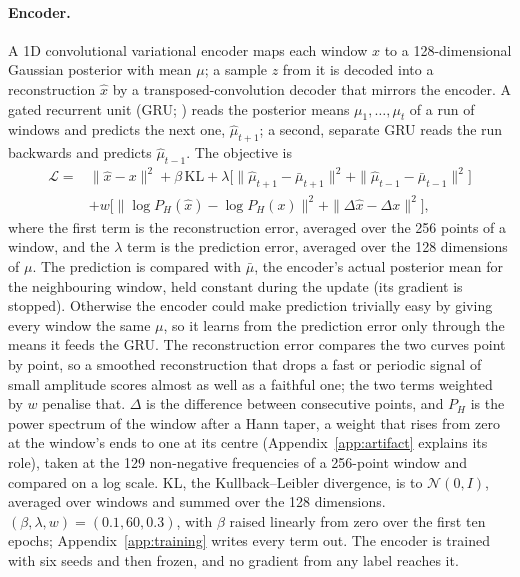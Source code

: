 \documentclass{article}
\begin{document}
\paragraph{Encoder.} A 1D convolutional variational encoder \citep{kingma2014} maps each window $x$
to a 128-dimensional Gaussian posterior with mean $\mu$; a sample $z$ from it is decoded into a
reconstruction $\hat{x}$ by a transposed-convolution decoder that mirrors the encoder. A gated
recurrent unit (GRU; \citealt{cho2014}) reads the posterior means $\mu_{1},\dots,\mu_{t}$ of a run of
windows and predicts the next one, $\hat{\mu}_{t+1}$; a second, separate GRU reads the run backwards
and predicts $\hat{\mu}_{t-1}$. The objective is
\begin{align*}
\mathcal{L} = {} & \|\hat{x}-x\|^{2} + \beta\,\mathrm{KL}
+ \lambda\big[\|\hat{\mu}_{t+1}-\bar{\mu}_{t+1}\|^{2} + \|\hat{\mu}_{t-1}-\bar{\mu}_{t-1}\|^{2}\big] \\
& + w\big[\|\log P_{H}(\hat{x})-\log P_{H}(x)\|^{2} + \|\Delta\hat{x}-\Delta x\|^{2}\big],
\end{align*}
where the first term is the reconstruction error, averaged over the 256 points of a window, and the
$\lambda$ term is the prediction error, averaged over the 128 dimensions of $\mu$. The prediction is
compared with $\bar{\mu}$, the encoder's actual posterior mean for the neighbouring window, held
constant during the update (its gradient is stopped). Otherwise the encoder could make prediction
trivially easy by giving every window the same $\mu$, so it learns from the prediction error only
through the means it feeds the GRU. The reconstruction error compares the two curves point by point,
so a smoothed reconstruction that drops a fast or periodic signal of small amplitude scores almost as
well as a faithful one; the two terms weighted by $w$ penalise that. $\Delta$ is the difference
between consecutive points, and $P_{H}$ is the power spectrum of the window after a Hann taper, a
weight that rises from zero at the window's ends to one at its centre (Appendix~\ref{app:artifact}
explains its role), taken at the 129 non-negative frequencies of a 256-point window and compared on a
log scale. KL, the Kullback--Leibler divergence, is to $\mathcal{N}(0,I)$, averaged over windows and
summed over the 128 dimensions. $(\beta,\lambda,w) = (0.1, 60, 0.3)$, with $\beta$ raised linearly
from zero over the first ten epochs; Appendix~\ref{app:training} writes every term out. The encoder is trained with six seeds and
then frozen, and no gradient from any label reaches it.
\end{document}
